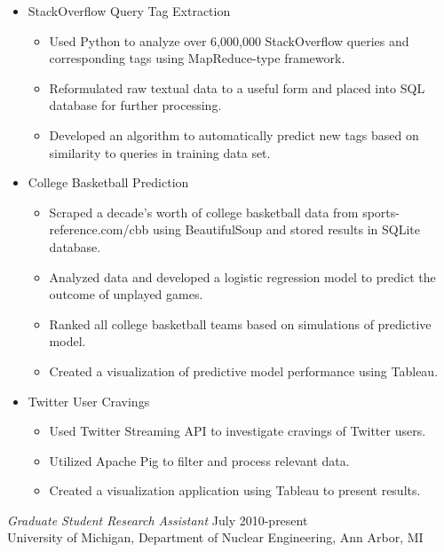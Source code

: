 \documentclass[margin, 10pt]{res} %
\begin{document}
\begin{resume}
\begin{itemize} \itemsep -2pt %
\item StackOverflow Query Tag Extraction
\begin{itemize}
\item Used Python to analyze over 6,000,000 StackOverflow queries and corresponding tags using MapReduce-type framework.  
\item Reformulated raw textual data to a useful form and placed into SQL database for further processing.
\item Developed an algorithm to automatically predict new tags based on similarity to queries in training data set. 
\end{itemize}
\item College Basketball Prediction
\begin{itemize}
\item Scraped a decade’s worth of college basketball data from sports-reference.com/cbb using BeautifulSoup and stored results in SQLite database.  
\item Analyzed data and developed a logistic regression model to predict the outcome of unplayed games. 
\item Ranked all college basketball teams based on simulations of predictive model. 
\item Created a visualization of predictive model performance using Tableau.
\end{itemize}
\item Twitter User Cravings
\begin{itemize}
\item Used Twitter Streaming API to investigate cravings of Twitter users. 
\item Utilized Apache Pig to filter and process relevant data. 
\item Created a visualization application using Tableau to present results. 
\end{itemize}
\end{itemize}

{\sl Graduate Student Research Assistant} \hfill July 2010-present \\
University of Michigan, Department of Nuclear Engineering, Ann Arbor, MI


\end{resume}
\end{document}
